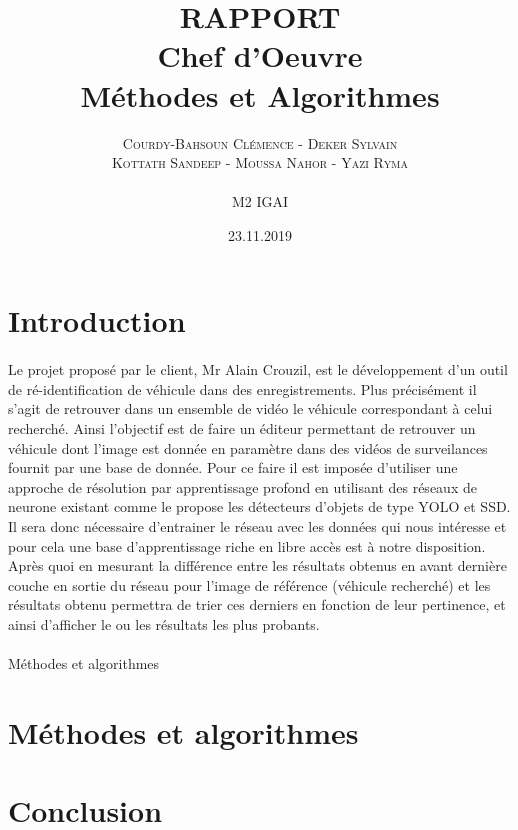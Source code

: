 \documentclass[a4paper,12pt]{report}
\title{\LARGE \textbf{RAPPORT\\ Chef d'O{e}uvre \\ Méthodes et Algorithmes }}
\author{\textsc{Courdy-Bahsoun Clémence - Deker Sylvain}\\
\textsc{Kottath Sandeep - Moussa Nahor - Yazi Ryma}\\\\
M2 IGAI  \\
}
\date{23.11.2019}
\begin{document}
\maketitle
\newpage


\section{Introduction}

\paragraph{}
Le projet proposé par le client, Mr Alain Crouzil, est le développement d'un outil de ré-identification de véhicule dans des enregistrements. Plus précisément il s'agit de retrouver dans un ensemble de vidéo le véhicule correspondant à celui recherché. Ainsi l'objectif est de faire un éditeur permettant de retrouver un véhicule dont l'image est donnée en paramètre dans des vidéos de surveilances fournit par une base de donnée. Pour ce faire il est imposée d'utiliser une approche de résolution par apprentissage profond en utilisant des réseaux de neurone existant comme le propose les détecteurs d'objets de type YOLO et SSD. Il sera donc nécessaire d'entrainer le réseau avec les données qui nous intéresse et pour cela une base d'apprentissage riche en libre accès est à notre disposition. Après quoi en mesurant la différence entre les résultats obtenus en avant dernière couche en sortie du réseau pour l'image de référence (véhicule recherché) et les résultats obtenu permettra de trier ces derniers en fonction de leur pertinence, et ainsi d'afficher le ou les résultats les plus probants.
    
    \paragraph{}
    Méthodes et algorithmes 
    
    

\section{Méthodes et algorithmes}



\section{Conclusion}
\end{document}
